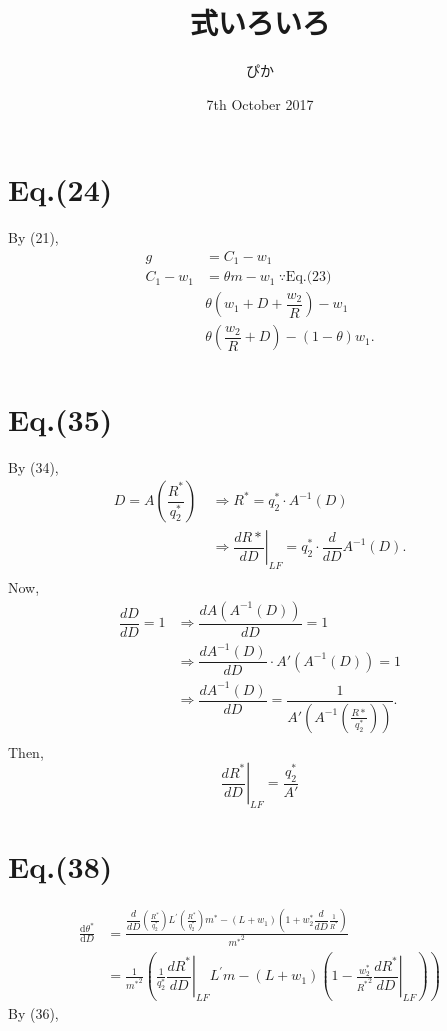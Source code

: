 \documentclass[a4paper,11pt]{article}
\title{式いろいろ}
\author{ぴか}
\date{7th October 2017}
\begin{document}
\maketitle

\section{Eq.(24)}
	By (21),
	\begin{align*}
		 g & = C_1 - w_1 \\
		C_1 - w_1 & = \theta m - w_1 \: \because \text{Eq.(23)} \\
			& \theta \left(w_1 + D + \dfrac{w_2}{R} \right) - w_1 \\
			& \theta \left(\dfrac{w_2}{R} + D\right) - (1-\theta) w_1. \\
	\end{align*}

\section{Eq.(35)}
	By (34),
	\begin{align*}
		D = A \left( \dfrac{R^*}{q_2^*}\right) \: & \Rightarrow R^* = q_2^* \cdot A^{-1}(D) \\
			& \Rightarrow  \left. \dfrac{dR*}{dD} \right|_{LF} = q_2^* \cdot \dfrac{d}{dD} A^{-1}(D). \\
	\end{align*}
	Now,
	\begin{align*}
			\dfrac{dD}{dD} = 1& \Rightarrow  \dfrac{dA(A^{-1}(D))}{dD} = 1 \\
			& \Rightarrow \dfrac{dA^{-1}(D)}{dD} \cdot A'(A^{-1}(D)) = 1 \\
			& \Rightarrow \dfrac{dA^{-1}(D)}{dD}= \dfrac{1}{A'\left(A^{-1}\left(\frac{R*}{q_2^*}\right)\right)}. \\
	\end{align*}
	Then,
	\begin{equation*}
		\left. \dfrac{dR^*}{dD} \right|_{LF} = \dfrac{q_2^*}{A'}
	\end{equation*}

\section{Eq.(38)}
	\begin{align*}
		\frac{\mathrm{d}\theta^*}{\mathrm{d}D} &= \frac{\dfrac{d}{dD}\left( \frac{R^*}{q_2^*} \right)L^{'}\left( \frac{R^*}{q_2^*} \right)m^* - (L+w_1)\left( 1 + w_2^*\dfrac{d}{dD}\frac{1}{R^*} \right)}{{m^*}^2}\\[8pt]
		&= \frac{1}{{m^*}^2} \left( \frac{1}{q_2^*} \left. \dfrac{dR^*}{dD} \right|_{LF} L^{'} m - (L + w_1)\left(1 - \frac{w_2^*}{{R^*}^2} \left. \dfrac{dR^*}{dD} \right|_{LF} \right) \right)
	\end{align*}
	By (36),
	\begin{align*}
		
	\end{align*}
\end{document}
